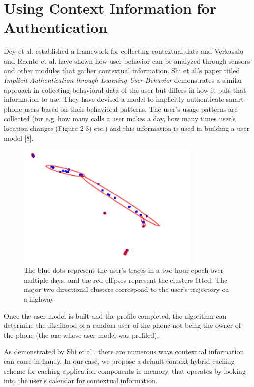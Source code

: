 \documentclass[12pt]{uthesis-v12}  %
\begin{document}
	\section{Using Context Information for Authentication}
		Dey et al. established a framework for collecting contextual data and Verkasalo and Raento et al. have shown how user behavior can be analyzed through sensors and other modules that gather contextual information. Shi et al.'s paper titled {\em Implicit Authentication through Learning User Behavior} demonstrates a similar approach in collecting behavioral data of the user but differs in how it puts that information to use. They have devised a model to implicitly authenticate smart-phone users based on their behavioral patterns. The user's usage patterns are collected (for e.g. how many calls a user makes a day, how many times user's location changes (Figure 2-3) etc.) and this information is used in building a user model [8].  
		
		\begin{figure}[!ht]
			\centering
			\includegraphics[width = 90mm]{images/gpsTrace.png}
			\caption[User's GPS Trace]
			{The blue dots represent the user’s traces in a two-hour epoch over multiple days, and the red ellipses represent the clusters fitted. The major two directional clusters correspond to the user’s trajectory on a highway}
		\end{figure}		
		Once the user model is built and the profile completed, the algorithm can determine the likelihood of a random user of the phone not being the owner of the phone (the one whose user model was profiled). 
		
		As demonstrated by Shi et al., there are numerous ways contextual information can come in handy. In our case, we propose a default-context hybrid caching scheme for caching application components in memory, that operates by looking into the user's calendar for contextual information.  			
	
\end{document}
